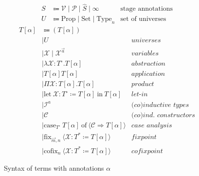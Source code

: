 \begin{figure}
\centering
\begin{align*}
S &\Coloneqq \mathcal{V} \mid \mathcal{P} \mid \widehat{S} \mid \infty &\text{stage annotations} \\
U &\Coloneqq \text{Prop} \mid \text{Set} \mid \text{Type}_n &\text{set of universes}
\end{align*}
\begin{align*}
T[\alpha] &\Coloneqq (T[\alpha]) \\
    &\mid U
        &\textit{universes}\\
    &\mid \mathcal{X} \mid \mathcal{X}^{\vec{a}}
        &\textit{variables} \\
    &\mid \lambda \mathcal{X}: T^\circ. T[\alpha]
        &\textit{abstraction} \\
    &\mid T[\alpha] T[\alpha]
        &\textit{application} \\
    &\mid \Pi \mathcal{X}: T[\alpha]. T[\alpha]
        &\textit{product} \\
    &\mid \text{let}\ \mathcal{X} : T^\circ \coloneqq T[\alpha] \ \text{in}\ T[\alpha]
        &\textit{let-in} \\
    &\mid \mathcal{I}^a
        &\textit{(co)inductive types} \\
    &\mid \mathcal{C}
        &\textit{(co)ind. constructors} \\
    &\mid \text{case}_{T^\circ} \ T[\alpha] \ \text{of} \ \langle \mathcal{C} \Rightarrow T[\alpha] \rangle
        &\textit{case analysis} \\
    &\mid \text{fix}_{\vec{m}, n} \ \langle \mathcal{X}: T^* \coloneqq T[\alpha] \rangle
        &\textit{fixpoint} \\
    &\mid \text{cofix}_{n} \ \langle \mathcal{X}: T^* \coloneqq T[\alpha] \rangle
        &\textit{cofixpoint}
\end{align*}
\caption{Syntax of \lang terms with annotations $\alpha$}
\label{fig:terms-general}
\end{figure}